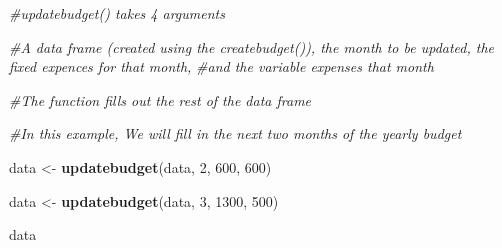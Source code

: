 \documentclass[
]{article}
\newenvironment{Shaded}{\begin{snugshade}}{\end{snugshade}}
\newcommand{\CommentTok}[1]{\textcolor[rgb]{0.56,0.35,0.01}{\textit{#1}}}
\newcommand{\DecValTok}[1]{\textcolor[rgb]{0.00,0.00,0.81}{#1}}
\newcommand{\KeywordTok}[1]{\textcolor[rgb]{0.13,0.29,0.53}{\textbf{#1}}}
\newcommand{\NormalTok}[1]{#1}
\newcommand{\StringTok}[1]{\textcolor[rgb]{0.31,0.60,0.02}{#1}}
\begin{document}
\begin{Shaded}
\begin{Highlighting}[]
\CommentTok{#updatebudget() takes 4 arguments}

\CommentTok{#A data frame (created using the createbudget()), the month to be updated, the fixed expences for that month,}
\CommentTok{#and the variable expenses that month}

\CommentTok{#The function fills out the rest of the data frame}

\CommentTok{#In this example, We will fill in the next two months of the yearly budget}

\NormalTok{data <-}\StringTok{ }\KeywordTok{updatebudget}\NormalTok{(data, }\DecValTok{2}\NormalTok{, }\DecValTok{600}\NormalTok{, }\DecValTok{600}\NormalTok{)}

\NormalTok{data <-}\StringTok{ }\KeywordTok{updatebudget}\NormalTok{(data, }\DecValTok{3}\NormalTok{, }\DecValTok{1300}\NormalTok{, }\DecValTok{500}\NormalTok{)}

\NormalTok{data}
\end{Highlighting}
\end{Shaded}
\end{document}
